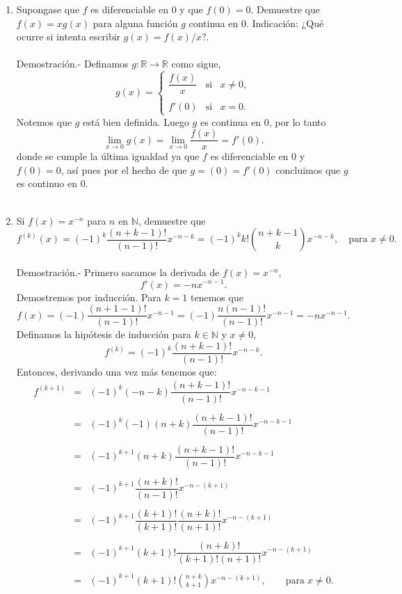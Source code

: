 \begin{enumerate}[\bfseries 1.]
     \item Supongase que $f$ es diferenciable en $0$ y que $f(0)=0$. Demuestre que $f(x)=xg(x)$ para alguna función $g$ continua en $0$. Indicación: ¿Qué ocurre si intenta escribir $g(x)=f(x)/x$?.\\\\
	 Demostración.-\; Definamos $g:\mathbb{R}\to \mathbb{R}$ como sigue,
	 $$g(x)=\left\{\begin{array}{rcl}
	    \dfrac{f(x)}{x} & \mbox{si} & x\neq 0,\\\\
	    f'(0) & \mbox{si} & x=0.
	 \end{array}\right.$$
	 Notemos que $g$ está bien definida. Luego $g$ es continua en $0$, por lo tanto
	 $$\lim_{x\to 0}g(x)=\lim_{x\to 0}\dfrac{f(x)}{x}=f'(0).$$
	 donde se cumple la última igualdad ya que $f$ es diferenciable en $0$ y $f(0)=0$, así pues por el hecho de que $g=(0)=f'(0)$ concluimos que $g$ es continuo en $0$.\\\\

     \item Si $f(x)=x^{-n}$ para $n$ en $\mathbb{N}$, demuestre que 
	 $$f^{(k)}(x)=(-1)^k \dfrac{(n+k-1)!}{(n-1)!}x^{-n-k}=(-1)^k k!{n+k-1 \choose k}x^{-n-k}, \quad \mbox{para } x\neq 0.$$\\
	 Demostración.-\; Primero sacamos la derivada de $f(x)=x^{-n}$,
	 $$f'(x)=-nx^{-n-1}.$$
	 Demostremos por inducción. Para $k=1$ tenemos que
	 $$f(x)=(-1) \dfrac{(n+1-1)!}{(n-1)!}x^{-n-1}=(-1) \dfrac{n(n-1)!}{(n-1)!}x^{-n-1}=-nx^{-n-1}.$$
	 Definamos la hipótesis de inducción para $k\in \mathbb{N}$ y $x\neq 0$,
	 $$f^{(k)} = (-1)^{k}\dfrac{(n+k-1)!}{(n-1)!}x^{-n-k}.$$
	 Entonces, derivando una vez más tenemos que:
	 $$\begin{array}{rcl}
	     f^{(k+1)}&=&(-1)^k(-n-k)\dfrac{(n+k-1)!}{(n-1)!}x^{-n-k-1}\\\\
		      &=&(-1)^{k}(-1)(n+k)\dfrac{(n+k-1)!}{(n-1)!}x^{-n-k-1}\\\\
		      &=&(-1)^{k+1}(n+k)\dfrac{(n+k-1)!}{(n-1)!}x^{-n-k-1}\\\\
		      &=&(-1)^{k+1}\dfrac{(n+k)!}{(n-1)!}x^{-n-(k+1)}\\\\
		      &=&(-1)^{k+1}\dfrac{(k+1)!}{(k+1)!}\dfrac{(n+k)!}{(n+1)!}x^{-n-(k+1)}\\\\
		      &=&(-1)^{k+1}(k+1)!\dfrac{(n+k)!}{(k+1)!(n+1)!}x^{-n-(k+1)}\\\\
		      &=&(-1)^{k+1}(k+1)!\displaystyle{n+k\choose k+1}x^{-n-(k+1)}, \qquad \mbox{para}\; x\neq 0.\\\\
	 \end{array}$$


\end{enumerate}
